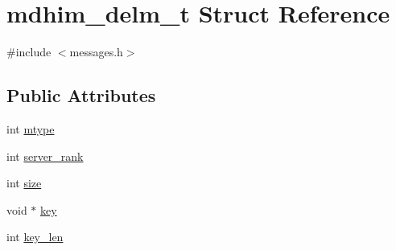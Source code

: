 \hypertarget{structmdhim__delm__t}{\section{mdhim\-\_\-delm\-\_\-t Struct Reference}
\label{d7/da5/structmdhim__delm__t}
}


{\ttfamily \#include $<$messages.\-h$>$}

\subsection*{Public Attributes}
\begin{DoxyCompactItemize}
\item 
int \hyperlink{structmdhim__delm__t_aed97225c8df041600c6b5fffb43a1bbc}{mtype}
\item 
int \hyperlink{structmdhim__delm__t_a00480044a106cf24c63e03b3d15320dc}{server\-\_\-rank}
\item 
int \hyperlink{structmdhim__delm__t_a72a3a5a840b005517685ab4a5f9e101e}{size}
\item 
void $\ast$ \hyperlink{structmdhim__delm__t_acedac9daad7ab8b9870f8c7c2a471ced}{key}
\item 
int \hyperlink{structmdhim__delm__t_aed818ed56728fe40acd3567fce5a2fb5}{key\-\_\-len}
\end{DoxyCompactItemize}


